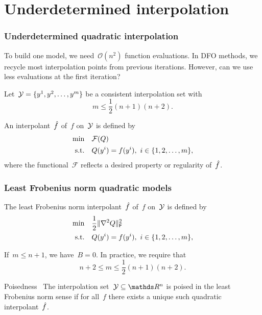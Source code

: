 \documentclass{polyu-presentation}
\newcommand{\obj}{f}
\newcommand{\objm}[1][]{\hat{f}\ifthenelse{\equal{#1}{}}{}{^{#1}}}
\newcommand{\xpt}[1][]{\mathcal{Y}\ifthenelse{\equal{#1}{}}{}{^{#1}}}
\begin{document}
\section{Underdetermined interpolation}

\begin{frame}
    \frametitle{Underdetermined quadratic interpolation}
    
    \begin{block}{}
        To build \alert{one} model, we need~$\mathcal{O}(n^2)$ function evaluations.
        In DFO methods, we \alert{recycle} most interpolation points from \alert{previous iterations}.
        However, can we \alert{use less} evaluations at the first iteration?
    \end{block}

    \medskip

    Let~$\xpt = \set{y^1, y^2, \dots, y^m}$ be a consistent interpolation set with
    \begin{equation*}
        m \le \frac{1}{2} (n + 1) (n + 2).
    \end{equation*}

    An interpolant~$\objm$ of~$\obj$ on~$\xpt$ is defined by
    \begin{align*}
        \min        & \quad \mathcal{F}(Q)\\
        \text{s.t.} & \quad Q(y^i) = \obj(y^i), ~ i \in \set{1, 2, \dots, m},
    \end{align*}
    where the \alert{functional}~$\mathcal{F}$ reflects a desired \alert{property} or \alert{regularity} of~$\objm$.
\end{frame}

\begin{frame}
    \frametitle{Least Frobenius norm quadratic models}

    The \alert{least Frobenius norm} interpolant~$\objm$ of~$\obj$ on~$\xpt$ is defined by
    \begin{align*}
        \min        & \quad \frac{1}{2} \norm{\nabla^2 Q}_{\mathsf{F}}^2\\
        \text{s.t.} & \quad Q(y^i) = \obj(y^i), ~ i \in \set{1, 2, \dots, m},
    \end{align*}

    \begin{block}{}
        If~$m \le n + 1$, we have~$B = 0$.
        In practice, we require that
        \begin{equation*}
            n + 2 \le m \le \frac{1}{2} (n + 1) (n + 2).
        \end{equation*}
    \end{block}

    \begin{block}{Poisedness~{\parencite{Conn_Scheinberg_Vicente_2009b}}}
        The interpolation set~$\xpt \subseteq \R^n$ is \alert{poised} in the least Frobenius norm sense if for all~$\obj$ there exists a \alert{unique} such quadratic interpolant~$\objm$.
    \end{block}
\end{frame}
\end{document}
